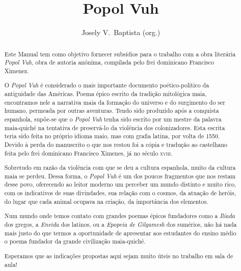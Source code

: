 \documentclass[12pt]{extarticle}
\begin{document}
\newcommand{\AutorLivro}{Josely V.~Baptista (org.)}
\newcommand{\TituloLivro}{Popol Vuh}
\newcommand{\Tema}{Ficção, mistério e fantasia}
\newcommand{\Genero}{Mitologia indígena}
\newcommand{\imagemCapa}{./images/PNLD0059-01.png}
\newcommand{\issnppub}{---}
\newcommand{\issnepub}{---}
\newcommand{\colaborador}{\textbf{Fulano de Tal} é uma pessoa incrível e vai fazer um bom serviço.}


\baselineskip\par


\title{\TituloLivro}
\author{\AutorLivro}
\def\authornotes{\colaborador}

\date{}
\maketitle

\begin{abstract}
Este Manual tem como objetivo fornecer subsídios para o trabalho com a
obra literária \emph{Popol Vuh}, obra de autoria anônima, compilada pelo
frei dominicano Francisco Ximenez.

O \emph{Popol Vuh} é considerado o mais importante documento poético-político
da antiguidade das Américas. Poema épico escrito da tradição mitológica maia, 
encontramos nele a narrativa maia da formação do universo e do surgimento do 
ser humano, permeada por outras aventuras. Tendo sido produzido após a conquista 
espanhola, supõe-se que o \emph{Popol Vuh} tenha sido escrito por um mestre da 
palavra maia-quiché na tentativa de preservá-lo da violência dos colonizadores. 
Esta escrita teria sido feita no próprio idioma maio, mas com grafia latina, 
por volta de 1550. Devido à perda do manuscrito o que nos restou foi a cópia e 
tradução ao castelhano feita pelo frei dominicano Francisco Ximenes, já no século \textsc{xviii}.

Sobretudo em razão da violência com que se deu a cultura espanhola, muito da 
cultura maia se perdeu. Dessa forma, o \emph{Popol Vuh} é um dos poucos 
fragmentos que nos restam desse povo, oferecendo ao leitor moderno um perceber 
um mundo distinto e muito rico, com os indicativos de suas divindades, sua relação 
com o cosmos, da atuação de heróis, do lugar que cada animal ocupava na criação, 
da importância dos elementos. 

Num mundo onde temos contato com grandes poemas épicos fundadores como a \emph{Ilíada} 
dos gregos, a \emph{Eneida} dos latinos, ou a \emph{Epopeia de Gilgamesh} dos sumérios, 
não há nada mais justo do que termos a oportunidade de apresentar aos estudantes do ensino 
médio o poema fundador da grande civilização maia-quiché. 

Esperamos que as indicações propostas aqui sejam muito úteis no trabalho em
sala de aula!



\end{abstract}
\end{document}

